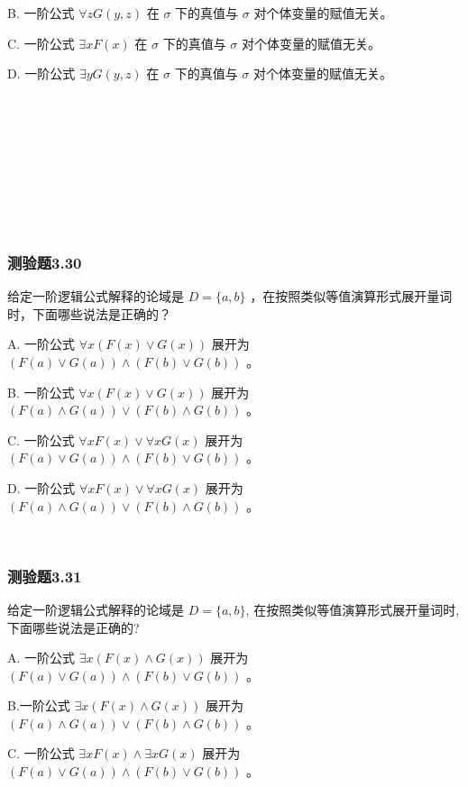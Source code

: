 \documentclass[UTF8, heading=true]{ctexart}
\begin{document}
B.
一阶公式 $\forall z G(y, z)$ 在 $\sigma$ 下的真值与 $\sigma$ 对个体变量的赋值无关。

C.
一阶公式 $\exists x F(x)$ 在 $\sigma$ 下的真值与 $\sigma$ 对个体变量的赋值无关。

D.
一阶公式 $\exists y G(y, z)$ 在 $\sigma$ 下的真值与 $\sigma$ 对个体变量的赋值无关。

\textcolor{white}{答案：ACD}

\textcolor{white}{解析：A选项，没有自由变量直接无关（因为无论如何赋值都无法影响约束变量）；B选项，当$y=a$为真，$y=b$为假，所以与赋值有关。\\ \indent lhr的总结：
$\sigma$只对自由变量起作用。如果有不自由的：如果他问，真值是什么，那就直接带，然后对那个约束变量对论域中的所有元素遍历，看真值；如果他问，是否有影响，那就不能直接带，就要对这个自由变量遍历所有元素（同时也要对其他的约束遍历），看会不会对真值产生影响}

\subsubsection{测验题3.30}

给定一阶逻辑公式解释的论域是 $D=\{a, b\}$ ，在按照类似等值演算形式展开量词时，下面哪些说法是正确的？

A. 一阶公式 $\forall x(F(x) \vee G(x))$ 展开为 $(F(a) \vee G(a)) \wedge(F(b) \vee G(b))$ 。

B. 一阶公式 $\forall x(F(x) \vee G(x))$ 展开为 $(F(a) \wedge G(a)) \vee(F(b) \wedge G(b))$ 。

C. 一阶公式 $\forall x F(x) \vee \forall x G(x)$ 展开为 $(F(a) \vee G(a)) \wedge(F(b) \vee G(b))$ 。

D.  一阶公式 $\forall x F(x) \vee \forall x G(x)$ 展开为 $(F(a) \wedge G(a)) \vee(F(b) \wedge G(b))$ 。

\textcolor{white}{答案：A}

\subsubsection{测验题3.31}

给定一阶逻辑公式解释的论域是 $D=\{a, b\}$, 在按照类似等值演算形式展开量词时, 下面哪些说法是正确的?

A. 一阶公式 $\exists x(F(x) \wedge G(x))$ 展开为 $(F(a) \vee G(a)) \wedge(F(b) \vee G(b))$ 。

B.一阶公式 $\exists x(F(x) \wedge G(x))$ 展开为 $(F(a) \wedge G(a)) \vee(F(b) \wedge G(b))$ 。

C. 一阶公式 $\exists x F(x) \wedge \exists x G(x)$ 展开为 $(F(a) \vee G(a)) \wedge(F(b) \vee G(b))$ 。
\end{document}
